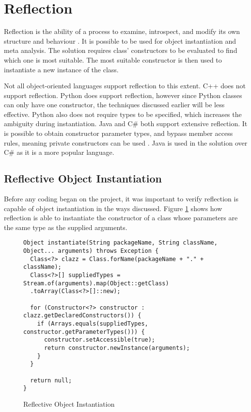 \section{Reflection}

Reflection is the ability of a process to examine, introspect, and modify its own structure and behaviour \cite{reflection}. It is possible to be used for object instantiation and meta analysis. The solution requires class’ constructors to be evaluated to find which one is most suitable. The most suitable constructor is then used to instantiate a new instance of the class.\par
Not all object-oriented languages support reflection to this extent. C++ does not support reflection. Python does support reflection, however since Python classes can only have one constructor, the techniques discussed earlier will be less effective. Python also does not require types to be specified, which increases the ambiguity during instantiation. Java and C\# both support extensive reflection. It is possible to obtain constructor parameter types, and bypass member access rules, meaning private constructors can be used \cite{reflection}. Java is used in the solution over C\# as it is a more popular language.
\subsection{Reflective Object Instantiation}
Before any coding began on the project, it was important to verify reflection is capable of object instantiation in the ways discussed. Figure \ref{fig:reflective_instantiation} shows how reflection is able to instantiate the constructor of a class whose parameters are the same type as the supplied arguments.
\begin{figure}
\caption{Reflective Object Instantiation}
\label{fig:reflective_instantiation}
\begin{verbatim}
Object instantiate(String packageName, String className,
Object... arguments) throws Exception {
  Class<?> clazz = Class.forName(packageName + "." + className);
  Class<?>[] suppliedTypes = Stream.of(arguments).map(Object::getClass)
  .toArray(Class<?>[]::new);

  for (Constructor<?> constructor : clazz.getDeclaredConstructors()) {
    if (Arrays.equals(suppliedTypes, constructor.getParameterTypes())) {
      constructor.setAccessible(true);
      return constructor.newInstance(arguments);
    }
  }

  return null;
}
\end{verbatim}
\end{figure}

